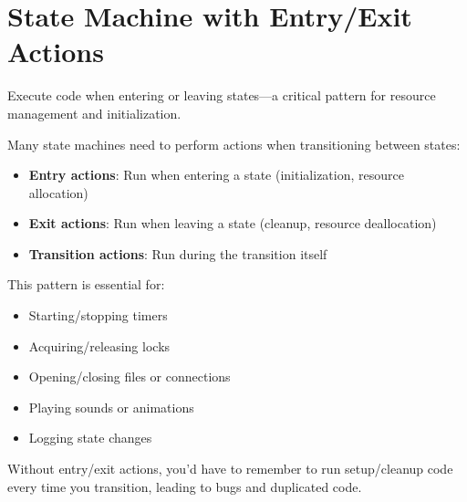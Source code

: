\section{State Machine with Entry/Exit Actions}

Execute code when entering or leaving states—a critical pattern for resource management and initialization.

Many state machines need to perform actions when transitioning between states:
\begin{itemize}
    \item \textbf{Entry actions}: Run when entering a state (initialization, resource allocation)
    \item \textbf{Exit actions}: Run when leaving a state (cleanup, resource deallocation)
    \item \textbf{Transition actions}: Run during the transition itself
\end{itemize}

This pattern is essential for:
\begin{itemize}
    \item Starting/stopping timers
    \item Acquiring/releasing locks
    \item Opening/closing files or connections
    \item Playing sounds or animations
    \item Logging state changes
\end{itemize}

Without entry/exit actions, you'd have to remember to run setup/cleanup code every time you transition, leading to bugs and duplicated code.

